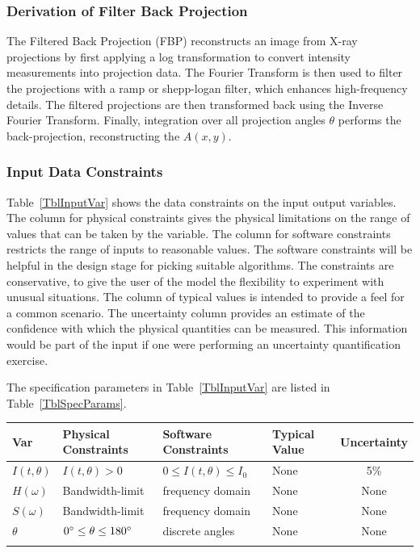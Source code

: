 \documentclass[12pt]{article}
\begin{document}

\subsubsection*{Derivation of Filter Back Projection}
The Filtered Back Projection (FBP) reconstructs an image from X-ray
projections by first applying a log transformation to convert intensity
measurements into projection data. The Fourier Transform is then used to filter
the projections with a ramp or shepp-logan filter, which enhances high-frequency
details. The filtered projections are then transformed back using the Inverse
Fourier Transform. Finally, integration over all projection angles $\theta$ performs the back-projection, reconstructing the $A(x,y)$.

\subsubsection{Input Data Constraints} \label{sec_DataConstraints}

Table~\ref{TblInputVar} shows the data constraints on the input output
variables.  The column for physical constraints gives the physical limitations
on the range of values that can be taken by the variable.  The column for
software constraints restricts the range of inputs to reasonable values.  The
software constraints will be helpful in the design stage for picking suitable
algorithms.  The constraints are conservative, to give the user of the model the
flexibility to experiment with unusual situations.  The column of typical values
is intended to provide a feel for a common scenario.  The uncertainty column
provides an estimate of the confidence with which the physical quantities can be
measured.  This information would be part of the input if one were performing an
uncertainty quantification exercise.

The specification parameters in Table~\ref{TblInputVar} are listed in
Table~\ref{TblSpecParams}.

\begin{table}[!h]
  \caption{Input Variables} \label{TblInputVar}
  \renewcommand{\arraystretch}{1.2}
\noindent \begin{longtable*}{l l l l c}
  \toprule
  \textbf{Var} & \textbf{Physical Constraints} & \textbf{Software Constraints} &
                             \textbf{Typical Value} & \textbf{Uncertainty}\\
  \midrule
  $I(t,\theta)$ & $I(t,\theta) > 0$ & $0 \leq I(t,\theta) \leq I_0$ & None & 5\%\\
  \midrule
  $H(\omega)$ & Bandwidth-limit & frequency domain & None & None\\
  \midrule
  $S(\omega)$ & Bandwidth-limit & frequency domain & None & None\\
  \midrule
  $\theta$ & $0\degree \leq \theta \leq 180\degree$ & discrete angles & None & None \\
  \\
  \bottomrule
\end{longtable*}
\end{table}
\end{document}
